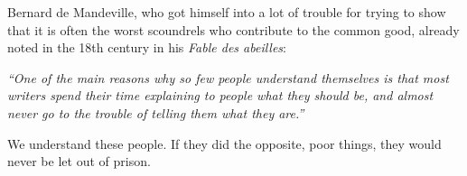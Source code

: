 Bernard de Mandeville, who got himself into a lot of trouble for trying to show that it is often the worst scoundrels who contribute to the common good, already noted in the 18th century in his \textit{Fable des abeilles}:

\begin{displayquote}
	\textit{
		``One of the main reasons why so few people understand themselves is that most writers spend their time explaining to people what they should be, and almost never go to the trouble of telling them what they are.''
	}
\end{displayquote}

We understand these people. If they did the opposite, poor things, they would never be let out of prison.